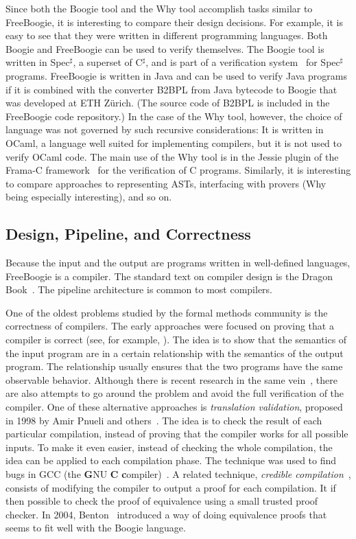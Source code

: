\documentclass{llncs}
\def\fb#1{{\bf #1}} %
\newcommand{\csharp}{C$^\sharp$\xspace}
\newcommand{\specsharp}{Spec$^\sharp$\xspace}
\begin{document}
Since both the Boogie tool and the Why tool accomplish tasks
similar to FreeBoogie, it is interesting to compare their design
decisions. For example, it is easy to see that they were written
in different programming languages. Both Boogie and FreeBoogie
can be used to verify themselves. The Boogie tool is written in
\specsharp, a superset of \csharp, and is part of a verification
system~\cite{barnett2005spec} for \specsharp programs. FreeBoogie
is written in Java and can be used to verify Java programs if it
is combined with the converter B2BPL from Java bytecode to Boogie
that was developed at ETH Z\"urich. (The source code of B2BPL
is included in the FreeBoogie code repository.) In the case of
the Why tool, however, the choice of language was not governed
by such recursive considerations: It is written in OCaml, a
language well suited for implementing compilers, but it is not
used to verify OCaml code. The main use of the Why tool is in
the Jessie plugin of the Frama-C framework~\cite{framac} for
the verification of C programs. Similarly, it is interesting to
compare approaches to representing ASTs, interfacing with provers
(Why being especially interesting), and so on.

\subsection{Design, Pipeline, and Correctness}

Because the input and the output are programs written in
well-defined languages, FreeBoogie is a compiler. The standard
text on compiler design is the Dragon Book~\cite{aho2007}. The
pipeline architecture is common to most compilers.

One of the oldest problems studied by the formal methods
community is the correctness of compilers. The early approaches
were focused on proving that a compiler is correct (see, for
example, \cite{moore1989cc}). The idea is to show that the
semantics of the input program are in a certain relationship
with the semantics of the output program. The relationship
usually ensures that the two programs have the same observable
behavior. Although there is recent research in the same
vein~\cite{leroy2009}, there are also attempts to go around the
problem and avoid the full verification of the compiler. One of
these alternative approaches is \emph{translation validation},
proposed in 1998 by Amir Pnueli and others~\cite{pnueli1998tv}.
The idea is to check the result of each particular compilation,
instead of proving that the compiler works for all possible
inputs. To make it even easier, instead of checking the whole
compilation, the idea can be applied to each compilation phase.
The technique was used to find bugs in GCC (the \fb GNU \fb
C \fb compiler)~\cite{necula2000tv}. A related technique,
\emph{credible compilation}~\cite{rinard1999credible}, consists
of modifying the compiler to output a proof for each compilation.
It if then possible to check the proof of equivalence using a
small trusted proof checker. In 2004, Benton~\cite{benton2004}
introduced a way of doing equivalence proofs that seems to
fit well with the Boogie language.
\end{document}
